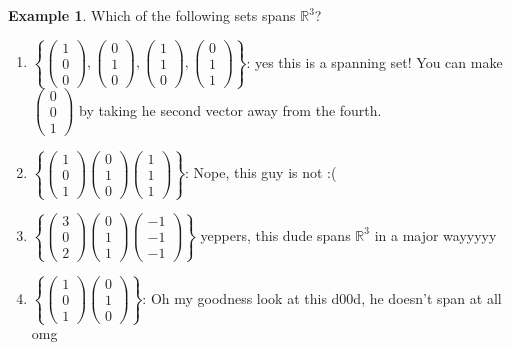 \documentclass{report}
\theoremstyle{remark}
\theoremstyle{definition}
\theoremstyle{definition}
\newtheorem{example}[theorem]{Example}
\theoremstyle{theorem}
\begin{document}
\begin{example}
Which of the following sets spans $\mathbb{R}^3$?
\begin{enumerate}
    \item  $\left\{\begin{pmatrix}1\\0\\0\end{pmatrix},\begin{pmatrix}0\\1\\0\end{pmatrix},\begin{pmatrix}1\\1\\0\end{pmatrix},\begin{pmatrix}0\\1\\1\end{pmatrix}\right\}$: yes this is a spanning set! You can make $\begin{pmatrix}0\\0\\1\end{pmatrix}$ by taking he second vector away from the fourth.
    \item $\left\{\begin{pmatrix}1\\0\\1\end{pmatrix}\begin{pmatrix}0\\1\\0\end{pmatrix}\begin{pmatrix}1\\1\\1\end{pmatrix} \right\}$: Nope, this guy is not :(
    \item $\left\{\begin{pmatrix}3\\0\\2\end{pmatrix}\begin{pmatrix}0\\1\\1\end{pmatrix}\begin{pmatrix}-1\\-1\\-1\end{pmatrix}\right\}$ yeppers, this dude spans $\mathbb{R}^3$ in a major wayyyyy
    \item $\left\{\begin{pmatrix}1\\0\\1\end{pmatrix}\begin{pmatrix}0\\1\\0\end{pmatrix}\right\}$: Oh my goodness look at this d00d, he doesn't span at all omg
\end{enumerate}
\end{example}
\end{document}
